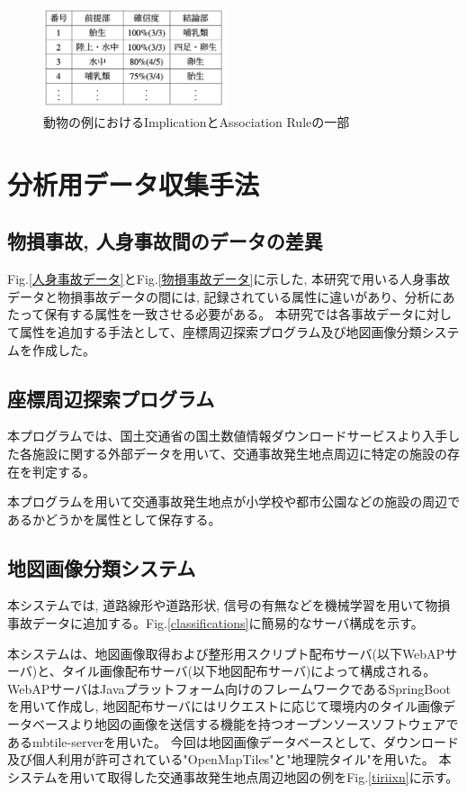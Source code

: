\documentclass[a4j,8.5pt, twocolumn,fleqn]{jbook}
\begin{document}
\begin{figure}[htb]
    \centering
    \includegraphics[height=30mm]{images/implication.png}
    \caption{動物の例におけるImplicationとAssociation Ruleの一部}
    \label{implications}
\end{figure}


\section{分析用データ収集手法}
\subsection{物損事故, 人身事故間のデータの差異}
Fig.\ref{人身事故データ}とFig.\ref{物損事故データ}に示した, 本研究で用いる人身事故データと物損事故データの間には, 記録されている属性に違いがあり、分析にあたって保有する属性を一致させる必要がある。
本研究では各事故データに対して属性を追加する手法として、座標周辺探索プログラム及び地図画像分類システムを作成した。

\subsection{座標周辺探索プログラム}
本プログラムでは、国土交通省の国土数値情報ダウンロードサービス\cite{国土数値情報ダウンロードサービス}より入手した各施設に関する外部データを用いて、交通事故発生地点周辺に特定の施設の存在を判定する。

本プログラムを用いて交通事故発生地点が小学校や都市公園などの施設の周辺であるかどうかを属性として保存する。

\subsection{地図画像分類システム}
本システムでは, 道路線形や道路形状, 信号の有無などを機械学習を用いて物損事故データに追加する。Fig.\ref{classifications}に簡易的なサーバ構成を示す。

本システムは、地図画像取得および整形用スクリプト配布サーバ(以下WebAPサーバ)と、タイル画像配布サーバ(以下地図配布サーバ)によって構成される。
WebAPサーバはJavaプラットフォーム向けのフレームワークであるSpringBoot\cite{literature3}を用いて作成し, 地図配布サーバにはリクエストに応じて環境内のタイル画像データベースより地図の画像を送信する機能を持つオープンソースソフトウェアであるmbtile-server\cite{literature4}を用いた。
今回は地図画像データベースとして、ダウンロード及び個人利用が許可されている"OpenMapTiles"と"地理院タイル"を用いた。
本システムを用いて取得した交通事故発生地点周辺地図の例をFig.\ref{tiriixn}に示す。
\end{document}
